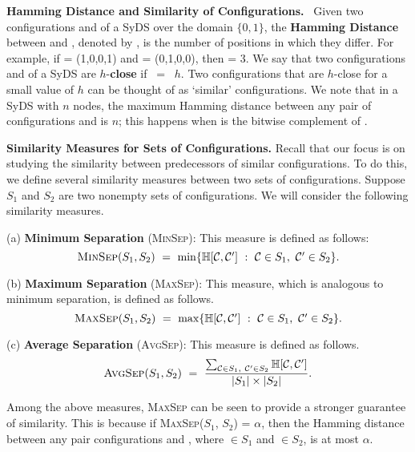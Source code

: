 \smallskip

\noindent
\textbf{Hamming Distance and Similarity of Configurations.}~
Given two configurations \calcone{} and \calctwo{} of a SyDS
over the domain $\{0,1\}$,
the \textbf{Hamming Distance} between \calcone{} and \calctwo, 
denoted by \calh[\calcone, \calctwo], is
the number of positions in which they differ.
For example, if
\calcone{} = (1,0,0,1) and \calctwo{} = (0,1,0,0),   
then \calh[\calcone, \calctwo] = 3.  
We say that two configurations \calcone{} and \calctwo{} 
of a SyDS are $h$-\textbf{close} if \calh[\calco, \calct] ~=~ $h$. 
Two configurations that are $h$-close for a small value of $h$
can be thought of as `similar' configurations.  
We note that in a SyDS with $n$ nodes, 
the maximum Hamming distance between any pair of configurations
\calcone{} and \calctwo{} is $n$; this happens when \calcone{}
is the bitwise complement of \calctwo. 

\smallskip

\noindent
\textbf{Similarity Measures for Sets of Configurations.} Recall
that our focus is on studying the similarity between predecessors
of similar configurations.
To do this, we define several similarity measures between two sets of
configurations.
Suppose $S_1$ and $S_2$ are two nonempty sets of configurations.
We will consider the following similarity measures.

\newcommand{\minsep}{\mbox{\textsc{MinSep}}}
\newcommand{\maxsep}{\mbox{\textsc{MaxSep}}}
\newcommand{\avgsep}{\mbox{\textsc{AvgSep}}}

\begin{description}
\item{(a)} \textbf{Minimum Separation} (\minsep): This measure is defined as follows:
\[ 
\minsep(S_1, S_2) ~=~ \min\{ \calh[\calc, \calcp] ~:~ 
                                \calc{} \in S_1,~ \calcp{} \in S_2\}.
\]
\item{(b)} \textbf{Maximum Separation} (\maxsep): This measure, which is
analogous to minimum separation, is defined as follows.
\[ 
\maxsep(S_1, S_2) ~=~ \max\{ \calh[\calc, \calcp] ~:~ 
                                \calc{} \in S_1,~ \calcp{} \in S_2\}.
\]
\item{(c)} \textbf{Average Separation} (\avgsep): This measure is defined as follows.
\[ 
\avgsep(S_1, S_2) ~=~ \displaystyle{\frac{\sum_{\mathcal{C} \in S_1,~ \mathcal{C}' \in S_2}
                            \calh[\calc, \calcp]}{|S_1| \times |S_2|}}.
\]
\end{description}
Among the above measures, \maxsep{} can be seen to provide 
a stronger guarantee of similarity.
This is because if \maxsep($S_1$, $S_2$) = $\alpha$, then the Hamming distance
between any pair configurations \calc{} and \calcp, where \calc{} $\in S_1$
and \calcp{} $\in S_2$, is at most $\alpha$.

